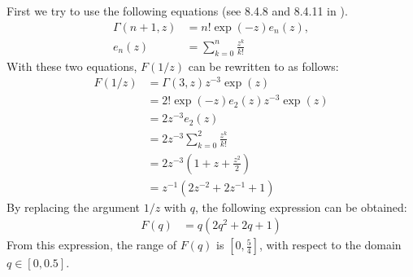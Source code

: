 ﻿\documentclass[a4paper,xelatex,english]{bxjsarticle}
\begin{document}
First we try to use the following equations (see 8.4.8 and 8.4.11 in \cite{MathHandbook}).
\begin{align}
\Gamma(n + 1, z) &= n!\exp(-z) e_{n}(z), \\
e_{n}(z) &= \sum_{k = 0}^{n}\frac{z^{k}}{k!}
\end{align}
With these two equations, $F(1/z)$ can be rewritten to as follows:
\begin{align}
F(1/z) &= \Gamma(3,z)z^{-3}\exp(z) \nonumber \\
&= 2!\exp(-z) e_{2}(z) z^{-3} \exp(z) \nonumber \\
&= 2 z^{-3} e_{2}(z) \nonumber \\
&= 2 z^{-3} \sum_{k = 0}^{2}\frac{z^{k}}{k!} \nonumber \\
&= 2 z^{-3} \left( 1 + z + \frac{z^{2}}{2} \right) \nonumber \\
&= z^{-1} \left( 2z^{-2} + 2z^{-1} + 1 \right) 
\label{eq:rewFin632}
\end{align}
By replacing the argument $1/z$ with $q$, the following expression can be obtained:
\begin{align}
F(q) &= q \left( 2q^{2} + 2q + 1 \right) \label{eq:rewFin632final}
\end{align}
From this expression, the range of $F(q)$ is $[0, \frac{5}{4}]$, with respect to the domain $q \in [0, 0.5]$.
\end{document}
